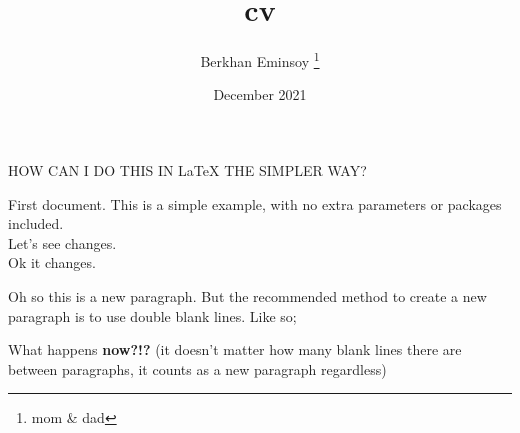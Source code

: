 \documentclass[letterpaper, 10pt]{article} %
\title{cv}
\author{Berkhan Eminsoy \thanks{mom \& dad}}
\date{December 2021}
\begin{document}
\maketitle

\begin{tcolorbox}[colback=gray!50, enhanced, sharp corners, frame hidden, halign=center]
HOW CAN I DO THIS IN \LaTeX{} THE SIMPLER WAY?
\end{tcolorbox}

First document. This is a simple example, with no 
extra parameters or packages included.
\\ Let's see changes.
\\ Ok it changes.

\noindent Oh so this is a new paragraph. But the recommended method to create a new paragraph is to use double blank lines. Like so;

What happens \textbf{now?!?} (it doesn't matter how many blank lines there are between paragraphs, it counts as a new paragraph regardless)


\setlength\LTleft{0pt}
\setlength\LTright{0pt}
\setlength{\tabcolsep}{0.0625in}
\end{document}
